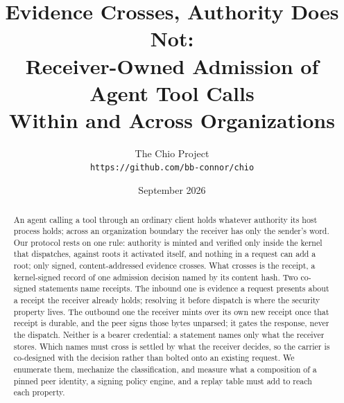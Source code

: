 \documentclass[10pt,letterpaper,onecolumn]{article}
\title{\vspace{-3em}Evidence Crosses, Authority Does Not:\\
Receiver-Owned Admission of Agent Tool Calls\\
Within and Across Organizations}
\author{The Chio Project\\
\small\texttt{https://github.com/bb-connor/chio}}
\date{\vspace{-0.5em}September 2026}
\begin{document}
\maketitle

\begin{abstract}
\noindent
An agent calling a tool through an ordinary client holds whatever authority its
host process holds; across an organization boundary the receiver has only the
sender's word. Our protocol rests on one rule: authority is minted and verified
only inside the kernel that dispatches, against roots it activated
itself, and nothing in a request can add a root; only signed, content-addressed
evidence crosses. What crosses is the receipt, a kernel-signed record of one
admission decision named by its content hash. Two co-signed statements name
receipts. The inbound one is evidence a request presents about a receipt the
receiver already holds; resolving it before dispatch is where the security
property lives. The outbound one the receiver mints over its own new receipt
once that receipt is durable, and the peer signs those bytes unparsed; it gates
the response, never the dispatch. Neither is a bearer credential: a statement
names only what the receiver stores. Which names must cross is settled by what
the receiver decides, so the carrier is co-designed with the decision rather
than bolted onto an existing request. We enumerate them, mechanize the
classification, and measure what a composition of a pinned peer identity, a
signing policy engine, and a replay table must add to reach each property.
\end{abstract}











{\scriptsize\linespread{0.93}\selectfont
\setlength{\bibsep}{0.3pt plus 0.2ex}

}
\end{document}
